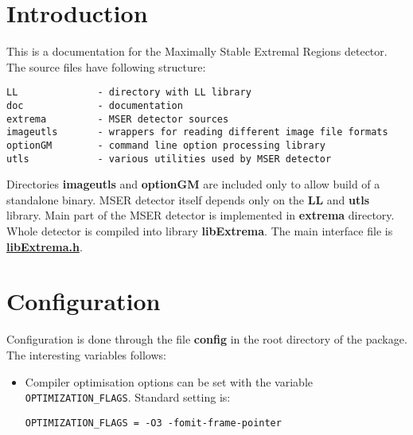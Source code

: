 \hypertarget{main_intro_sec}{}\section{Introduction}\label{main_intro_sec}
This is a documentation for the Maximally Stable Extremal Regions detector. The source files have following structure: 

\begin{Code}\begin{verbatim}LL              - directory with LL library
doc             - documentation
extrema         - MSER detector sources
imageutls       - wrappers for reading different image file formats
optionGM        - command line option processing library
utls            - various utilities used by MSER detector
\end{verbatim}\end{Code}



Directories {\bf imageutls} and {\bf option\-GM} are included only to allow build of a standalone binary. MSER detector itself depends only on the {\bf LL} and {\bf utls} library. Main part of the MSER detector is implemented in {\bf extrema} directory. Whole detector is compiled into library {\bf lib\-Extrema}. The main interface file is {\bf \hyperlink{libExtrema_8h}{lib\-Extrema.h}}.\hypertarget{main_install_sec}{}\section{Configuration}\label{main_install_sec}
Configuration is done through the file {\bf config} in the root directory of the package. The interesting variables follows:

\begin{itemize}
\item Compiler optimisation options can be set with the variable {\tt OPTIMIZATION\_\-FLAGS}. Standard setting is: 

\begin{Code}\begin{verbatim}OPTIMIZATION_FLAGS = -O3 -fomit-frame-pointer
\end{verbatim}\end{Code}

\end{itemize}


